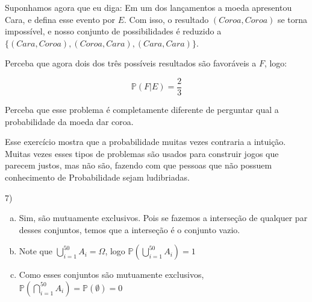 \documentclass[12pt]{article}
\begin{document}
Suponhamos agora que eu diga: Em um dos lançamentos a moeda apresentou Cara, e defina esse evento por $E$. Com isso, o resultado $(Coroa, Coroa)$ se torna impossível, e nosso conjunto de possibilidades
é reduzido a $\{(Cara, Coroa), (Coroa, Cara), (Cara, Cara)\}$.

Perceba que agora dois dos três possíveis resultados são favoráveis a $F$, logo:

$$\mathds{P}(F|E) = \dfrac{2}{3}$$


Perceba que esse problema é completamente diferente de perguntar qual a probabilidade da moeda dar coroa. 

Esse exercício mostra que a probabilidade muitas vezes contraria a intuição. Muitas vezes esses tipos de problemas são usados para construir jogos que parecem justos, mas não são, fazendo com que
pessoas que não possuem conhecimento de Probabilidade sejam ludibriadas. 


\vspace{5px}

7)

\begin{enumerate}[a)]
    \item Sim, são mutuamente exclusivos. Pois se fazemos a interseção de qualquer par desses conjuntos, temos que a interseção é o conjunto vazio. 
    \item Note que  $\displaystyle\bigcup _{i=1}^{50} A_i = \Omega$, logo $\mathds{P}\left(\displaystyle\bigcup _{i=1}^{50} A_i \right) = 1$
    \item Como esses conjuntos são mutuamente exclusivos,  $\mathds{P}\left(\displaystyle\bigcap _{i=1}^{50} A_i \right) = \mathds{P}(\emptyset) = 0$
\end{enumerate}
\end{document}
